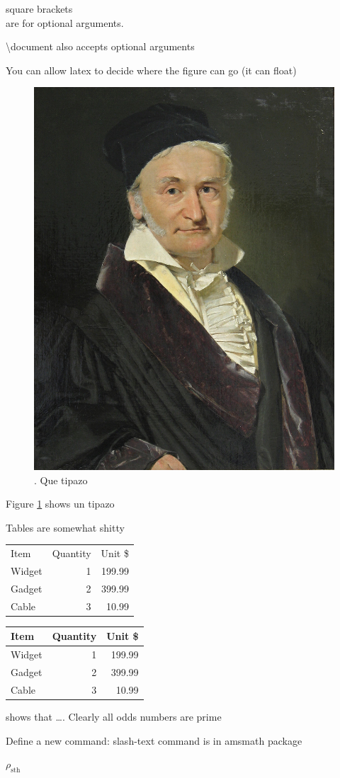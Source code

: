 \documentclass{article}
\begin{document}
square brackets \[ \] are for optional arguments.

\textbackslash document also accepts optional arguments

You can allow latex to decide where the figure can go (it can float)

\begin{figure}
\centering
    \includegraphics[width=.5\textwidth]{gauss.jpeg}
\caption{\label{fig:gauss}. Que tipazo}
\end{figure}

Figure \ref{fig:gauss} shows un tipazo

Tables are somewhat shitty

\begin{tabular}{lrr} %
Item    & Quantity  & Unit \$   \\
Widget  & 1         & 199.99    \\
Gadget  & 2         & 399.99    \\
Cable   & 3         & 10.99     \\
\end{tabular}

\begin{tabular}{|l|r|r|} \hline %
Item    & Quantity  & Unit \$   \\\hline
Widget  & 1         & 199.99    \\
Gadget  & 2         & 399.99    \\
Cable   & 3         & 10.99     \\\hline
\end{tabular}


\citet{Brooks1997Methodology} shows that \ldots. Clearly all odds numbers
are prime \citep{Jacobson1999Towards}

Define a new command: slash-text command is in amsmath package
\newcommand{\rperf}{\rho_{\text{sth}}}

$\rperf$




\end{document}
